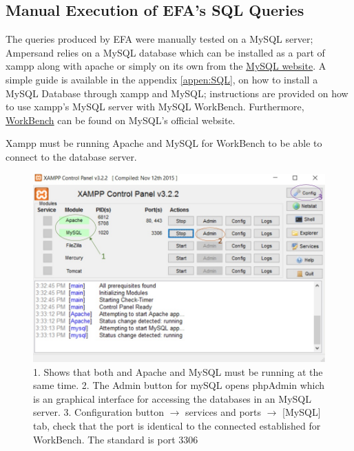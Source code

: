 \subsection{Manual Execution of EFA's SQL Queries}

The queries produced by EFA were manually tested on a MySQL server; Ampersand 
relies on a MySQL database which can be installed as a part of xampp along with 
apache or simply on its own from the 
\href{https://dev.mysql.com/downloads/mysql/}{MySQL website}. A simple guide is 
available in the appendix \ref{appen:SQL}, on how to install a MySQL Database 
through xampp and MySQL; instructions are provided on how to use xampp's MySQL 
server with MySQL WorkBench. Furthermore, 
\href{https://dev.mysql.com/downloads/workbench/}{WorkBench} can be found on 
MySQL's official website.

Xampp must be running Apache and MySQL for WorkBench to be able to connect to 
the database server. 
\begin{figure}[!h]
    \includegraphics[width=\textwidth]{images/xampp}
    \caption{\footnotesize{1. Shows that both and Apache and MySQL must be 
    running at the same time. 2. The Admin button for mySQL opens phpAdmin 
    which is an graphical interface for accessing the databases in an MySQL 
    server. 3. Configuration button $\rightarrow$ services and ports 
    $\rightarrow$ [MySQL] tab, check that the port is identical to the 
    connected established for WorkBench. The standard is port 3306 }}
\end{figure}

